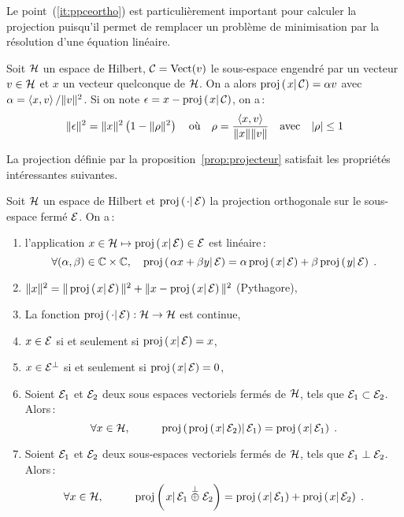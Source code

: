 Le point~(\ref{it:ppceortho}) est particuli\`{e}rement important pour calculer la
projection puisqu'il permet de remplacer un probl\`{e}me de minimisation par la
r\'{e}solution d'une \'{e}quation lin\'{e}aire.
\begin{example} 
 \label{exe:proj1vecteur}
 Soit $\cal H$ un espace de Hilbert, $\mathcal{C}=\mathrm{Vect}(v)$
le sous-espace engendr\'{e} par un vecteur $v\in\mathcal{H}$ et $x$ un vecteur
quelconque de $\cal H$. On a alors $\proj{x}{\cC}=\alpha v$ avec
$\alpha=\left\langle x, v \right\rangle/\|v\|^2$. Si on note $\epsilon=x-\proj{x}{\cC}$, on a\,:
$$
 \|\epsilon\|^2= \|x\|^2\left( 1 - \|\rho\|^2 \right)
 \quad\mbox{o\`{u}}\quad
 \rho=\frac{\left\langle x, v \right\rangle}{\|x\| \|v\|}
 \quad\mbox{avec}\quad |\rho|\leq 1
$$
\end{example}
La projection d\'{e}finie par la proposition~\ref{prop:projecteur} satisfait les
propri\'{e}t\'{e}s int\'{e}ressantes suivantes.
\begin{proposition}
\label{prop:projecteur} Soit $\cal H$ un espace de Hilbert et $\proj{\cdot}{\cE}$ la projection orthogonale sur le sous-espace
ferm\'{e} $\mathcal{E}$. On a\,:
\begin{enumerate}
   \item l'application $x \in \cH \mapsto \proj{x}{\cE} \in \cE$ est
lin\'{e}aire\,:
\[
 \forall (\alpha, \beta) \in \Cset \times \Cset,
 \quad
 \proj{\alpha x + \beta y}{\cE}= \alpha \proj{x}{\cE} + \beta \proj{y}{\cE} \eqsp.
\]
   \item
$\|x\|^2= \| \proj{x}{\cE} \|^2+\| x - \proj{x}{\cE} \|^2$ (Pythagore),
   \item La fonction $\proj{\cdot}{\cE}: \cH \rightarrow \cH$ est
continue,
   \item $x\in \mathcal{E}$ si et seulement si  $\proj{x}{\cE} = x$,
   \item $x\in \mathcal{E}^{\perp}$ si et seulement si $\proj{x}{\cE} =0$,
   \item Soient $\mathcal{E}_1$ et $\mathcal{E}_2$ deux sous espaces vectoriels ferm\'{e}s
de $\mathcal{H}$, tels que $\mathcal{E}_1 \subset \mathcal{E}_2$. Alors\,:
\[
  \forall x \in \cH, \hspace{1cm}
     \proj{ \proj{x}{\cE_2}}{\cE_1} = \proj{x}{\cE_1} \eqsp.
\]
   \item\label{it:ortho_proj_sum} Soient $\mathcal{E}_1$ et $\mathcal{E}_2$ deux sous-espaces vectoriels ferm\'{e}s
de $\mathcal{H}$, tels que $\mathcal{E}_1 \perp \mathcal{E}_2$. Alors\,:
\[
 \forall x \in \cH, \hspace{1cm}
     \proj{x}{\cE_1 \oplusperp \cE_2} = \proj{x}{\cE_1} + \proj{x}{\cE_2} \eqsp.
\]
\end{enumerate}
\end{proposition}
